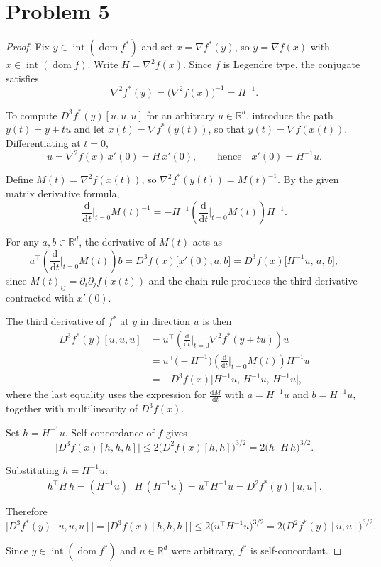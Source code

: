 \section*{Problem 5}

\begin{proof}
Fix $y \in \operatorname{int}(\operatorname{dom} f^*)$ and set $x = \nabla f^*(y)$, so $y = \nabla f(x)$ with $x \in \operatorname{int}(\operatorname{dom} f)$. Write $H = \nabla^2 f(x)$. Since $f$ is Legendre type, the conjugate satisfies
\[
\nabla^2 f^*(y) = \bigl(\nabla^2 f(x)\bigr)^{-1} = H^{-1}.
\]

To compute $D^3 f^*(y)[u,u,u]$ for an arbitrary $u \in \mathbb{R}^d$, introduce the path $y(t) = y + tu$ and let $x(t) = \nabla f^*(y(t))$, so that $y(t) = \nabla f(x(t))$. Differentiating at $t = 0$,
\[
u = \nabla^2 f(x) \, x'(0) = H \, x'(0), \qquad \text{hence} \quad x'(0) = H^{-1} u.
\]

Define $M(t) = \nabla^2 f(x(t))$, so $\nabla^2 f^*(y(t)) = M(t)^{-1}$. By the given matrix derivative formula,
\[
\frac{\mathrm{d}}{\mathrm{d}t}\Big|_{t=0} M(t)^{-1} = -H^{-1} \left(\frac{\mathrm{d}}{\mathrm{d}t}\Big|_{t=0} M(t)\right) H^{-1}.
\]

For any $a, b \in \mathbb{R}^d$, the derivative of $M(t)$ acts as
\[
a^\top \!\left(\frac{\mathrm{d}}{\mathrm{d}t}\Big|_{t=0} M(t)\right) b = D^3 f(x)\bigl[x'(0), a, b\bigr] = D^3 f(x)\bigl[H^{-1}u,\, a,\, b\bigr],
\]
since $M(t)_{ij} = \partial_i \partial_j f(x(t))$ and the chain rule produces the third derivative contracted with $x'(0)$.

The third derivative of $f^*$ at $y$ in direction $u$ is then
\begin{align*}
D^3 f^*(y)[u,u,u]
&= u^\top \!\left(\frac{\mathrm{d}}{\mathrm{d}t}\Big|_{t=0} \nabla^2 f^*(y+tu)\right) u \\
&= u^\top \bigl(-H^{-1}\bigr) \left(\frac{\mathrm{d}}{\mathrm{d}t}\Big|_{t=0} M(t)\right) H^{-1} u \\
&= -D^3 f(x)\bigl[H^{-1}u,\, H^{-1}u,\, H^{-1}u\bigr],
\end{align*}
where the last equality uses the expression for $\tfrac{\mathrm{d}M}{\mathrm{d}t}$ with $a = H^{-1}u$ and $b = H^{-1}u$, together with multilinearity of $D^3 f(x)$.

Set $h = H^{-1}u$. Self-concordance of $f$ gives
\[
\bigl|D^3 f(x)[h,h,h]\bigr| \leq 2\bigl(D^2 f(x)[h,h]\bigr)^{3/2} = 2\bigl(h^\top H\, h\bigr)^{3/2}.
\]

Substituting $h = H^{-1}u$:
\[
h^\top H\, h = (H^{-1}u)^\top H\, (H^{-1}u) = u^\top H^{-1} u = D^2 f^*(y)[u,u].
\]

Therefore
\[
\bigl|D^3 f^*(y)[u,u,u]\bigr| = \bigl|D^3 f(x)[h,h,h]\bigr| \leq 2\bigl(u^\top H^{-1} u\bigr)^{3/2} = 2\bigl(D^2 f^*(y)[u,u]\bigr)^{3/2}.
\]

Since $y \in \operatorname{int}(\operatorname{dom} f^*)$ and $u \in \mathbb{R}^d$ were arbitrary, $f^*$ is self-concordant.
\end{proof}
